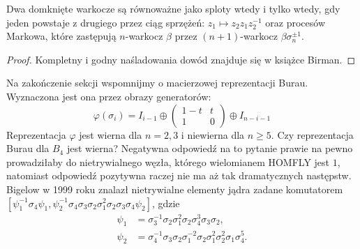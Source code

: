 \begin{theorem}[Markow, 1936]
    Dwa domknięte warkocze są równoważne jako sploty wtedy i tylko wtedy,
    gdy jeden powstaje z drugiego przez ciąg
    sprzężeń: $z_1 \mapsto z_2 z_1 z_2^{-1}$ oraz procesów Markowa,
    które zastępują $n$-warkocz $\beta$ przez $(n+1)$-warkocz $\beta\sigma_n^{\pm 1}$.
\end{theorem}

\begin{proof}
    Kompletny i godny naśladowania dowód znajduje się w książce \cite{birman74} Birman.
\end{proof}

Na zakończenie sekcji wspomnijmy o macierzowej reprezentacji Burau.
Wyznaczona jest ona przez obrazy generatorów:
\[
    \varphi(\sigma_i) = I_{i-1} \oplus \begin{pmatrix}
        1-t & t \\
        1   & 0
    \end{pmatrix} \oplus I_{n-i-1}
\]
Reprezentacja $\varphi$ jest wierna dla $n = 2, 3$ i niewierna dla $n \ge 5$.
Czy reprezentacja Burau dla $B_4$ jest wierna?
Negatywna odpowiedź na to pytanie prawie na pewno prowadziłaby do
nietrywialnego węzła, którego wielomianem HOMFLY jest $1$,
natomiast odpowiedź pozytywna raczej nie ma aż tak dramatycznych następstw.
Bigelow w 1999 roku znalazł nietrywialne elementy jądra zadane komutatorem $[\psi_1^{{-1}}\sigma_4\psi_1,\psi_2^{{-1}}\sigma_4\sigma_3\sigma_2\sigma_1^2\sigma_2\sigma_3\sigma_4\psi_2]$, gdzie
    \begin{align*}
        \psi_1 & = \sigma_3^{{-1}}\sigma_2\sigma_1^2\sigma_2\sigma_4^3\sigma_3\sigma_2, \\
\psi_2 & = \sigma_4^{{-1}}\sigma_3\sigma_2\sigma_1^{{-2}}\sigma_2\sigma_1^2\sigma_2^2\sigma_1\sigma_4^5.
    \end{align*}



